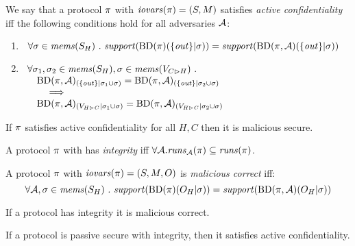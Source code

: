 \begin{definition}
  We say that a protocol $\pi$ with $\mathit{iovars}(\pi) = (S,M)$ satisfies \emph{active confidentiality} iff the following conditions hold
  for all adversaries $\mathcal{A}$:
  \begin{enumerate}
  \item $\ \,\forall \store \in \mems(S_H) \ .\ \support(\progtt(\prog)(\{ \outv \}|\store)) =
    \support(\progtt(\prog,\adversary)(\{ \outv \}|\store))$
  \item $\begin{array}[t]{l}\forall \sigma_1, \sigma_2 \in \mathit{mems}(S_H), \sigma \in \mathit{mems}(V_{C \rhd H})\ . \\
    \quad
    \mathrm{BD}(\pi,\mathcal{A})_{({\{ \mathit{out} \}}|{\sigma_1 \cup \sigma})} =
    \mathrm{BD}(\pi,\mathcal{A})_{({\{ \mathit{out} \}}|{\sigma_2 \cup \sigma})} \\
    \qquad \implies\\
    \quad
    \mathrm{BD}(\pi,\mathcal{A})_{({V_{H \rhd C}}|{\sigma_1 \cup \sigma})} =
    \mathrm{BD}(\pi,\mathcal{A})_{({V_{H \rhd C}}|{\sigma_2 \cup \sigma})}\end{array}$
  \end{enumerate}
\end{definition}

\begin{theorem}
  If $\pi$ satisfies active confidentiality for all $H,C$ then it is malicious secure.
\end{theorem}

\begin{definition}
  A protocol $\pi$ with has \emph{integrity} iff 
  $\forall \mathcal{A} . \mathit{runs}_{\mathcal{A}}(\pi) \subseteq \mathit{runs}(\pi)$.
\end{definition}

\begin{definition}
  A protocol $\pi$ with $\mathit{iovars}(\pi) = (S,M,O)$ is \emph{malicious correct} iff:
  $$
  \forall \mathcal{A}, \sigma \in \mathit{mems}(S_H) \ .\ \mathit{support}(\mathrm{BD}(\pi)(O_H|\sigma)) =
    \mathit{support}(\mathrm{BD}(\pi,\mathcal{A})(O_H|\sigma))
  $$
\end{definition}

\begin{theorem}
  If a protocol has integrity it is malicious correct.
\end{theorem}

\begin{theorem}
  If a protocol is passive secure with integrity, then it satisfies active confidentiality.
\end{theorem}

